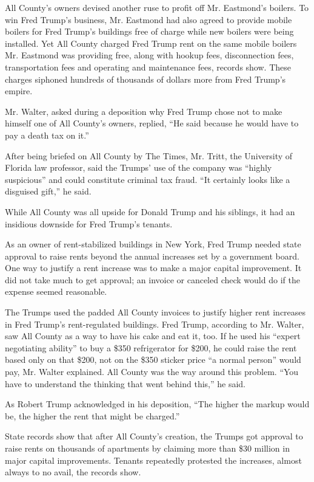 All County's owners devised another ruse to profit off Mr. Eastmond's
boilers. To win Fred Trump's business, Mr. Eastmond had also agreed to
provide mobile boilers for Fred Trump's buildings free of charge while
new boilers were being installed. Yet All County charged Fred Trump rent
on the same mobile boilers Mr. Eastmond was providing free, along with
hookup fees, disconnection fees, transportation fees and operating and
maintenance fees, records show. These charges siphoned hundreds of
thousands of dollars more from Fred Trump's empire.

Mr. Walter, asked during a deposition why Fred Trump chose not to make
himself one of All County's owners, replied, ``He said because he would
have to pay a death tax on it.''

After being briefed on All County by The Times, Mr. Tritt, the
University of Florida law professor, said the Trumps' use of the company
was ``highly suspicious'' and could constitute criminal tax fraud. ``It
certainly looks like a disguised gift,'' he said.

While All County was all upside for Donald Trump and his siblings, it
had an insidious downside for Fred Trump's tenants.

As an owner of rent-stabilized buildings in New York, Fred Trump needed
state approval to raise rents beyond the annual increases set by a
government board. One way to justify a rent increase was to make a major
capital improvement. It did not take much to get approval; an invoice or
canceled check would do if the expense seemed reasonable.

The Trumps used the padded All County invoices to justify higher rent
increases in Fred Trump's rent-regulated buildings. Fred Trump,
according to Mr. Walter, saw All County as a way to have his cake and
eat it, too. If he used his ``expert negotiating ability'' to buy a
\$350 refrigerator for \$200, he could raise the rent based only on that
\$200, not on the \$350 sticker price ``a normal person'' would pay, Mr.
Walter explained. All County was the way around this problem. ``You have
to understand the thinking that went behind this,'' he said.

As Robert Trump acknowledged in his deposition, ``The higher the markup
would be, the higher the rent that might be charged.''

State records show that after All County's creation, the Trumps got
approval to raise rents on thousands of apartments by claiming more than
\$30 million in major capital improvements. Tenants repeatedly protested
the increases, almost always to no avail, the records show.

